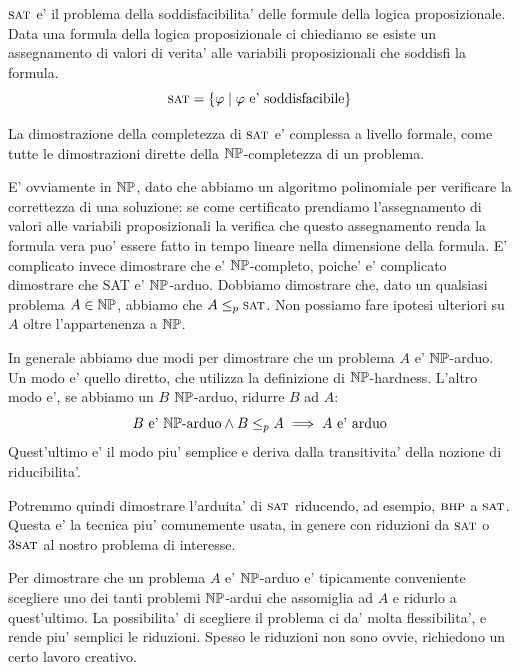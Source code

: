$\textsc{sat}$ e' il problema della soddisfacibilita' delle formule della logica proposizionale. Data una
formula della logica proposizionale ci chiediamo se esiste un assegnamento di valori di verita' alle
variabili proposizionali che soddisfi la formula.
\begin{equation*}
    \textsc{sat} = \{\varphi \mid \text{$\varphi$ e' soddisfacibile}\}
\end{equation*}

La dimostrazione della completezza di $\textsc{sat}$ e' complessa a livello formale, come tutte le
dimostrazioni dirette della $\mathbb{NP}$-completezza di un problema.

E' ovviamente in $\mathbb{NP}$, dato che abbiamo un algoritmo polinomiale per verificare la correttezza
di una soluzione: se come certificato prendiamo l'assegnamento di valori alle variabili
proposizionali la verifica che questo assegnamento renda la formula vera puo' essere fatto in tempo
lineare nella dimensione della formula. E' complicato invece dimostrare che e' $\mathbb{NP}$-completo,
poiche' e' complicato dimostrare che SAT e' $\mathbb{NP}$-arduo. Dobbiamo dimostrare che, dato un
qualsiasi problema  $A \in \mathbb{NP}$, abbiamo che $A \leq_{p} \textsc{sat}$. Non possiamo fare ipotesi
ulteriori su $A$ oltre l'appartenenza a $\mathbb{NP}$.

In generale abbiamo due modi per dimostrare che un problema $A$ e' $\mathbb{NP}$-arduo.
Un modo e' quello diretto, che utilizza la definizione di $\mathbb{NP}$-hardness. L'altro modo e', se
abbiamo un $B$ $\mathbb{NP}$-arduo, ridurre $B$ ad $A$:
\begin{equation*}
    B\text{ e' $\mathbb{NP}$-arduo} \land B \leq_{p} A \implies \text{$A$ e' arduo}
\end{equation*}
Quest'ultimo e' il modo piu' semplice e deriva dalla transitivita' della nozione di riducibilita'.

Potremmo quindi dimostrare l'arduita' di $\textsc{sat}$ riducendo, ad esempio, $\textsc{bhp}$ a $\textsc{sat}$. Questa e' la
tecnica piu' comunemente usata, in genere con riduzioni da $\textsc{sat}$ o $3\textsc{sat}$ al nostro problema di
interesse.

Per dimostrare che un problema $A$ e' $\mathbb{NP}$-arduo e' tipicamente conveniente scegliere uno dei
tanti problemi $\mathbb{NP}$-ardui che assomiglia ad $A$ e ridurlo a quest'ultimo. La possibilita' di
scegliere il problema ci da' molta flessibilita', e rende piu' semplici le riduzioni. Spesso le
riduzioni non sono ovvie, richiedono un certo lavoro creativo.

